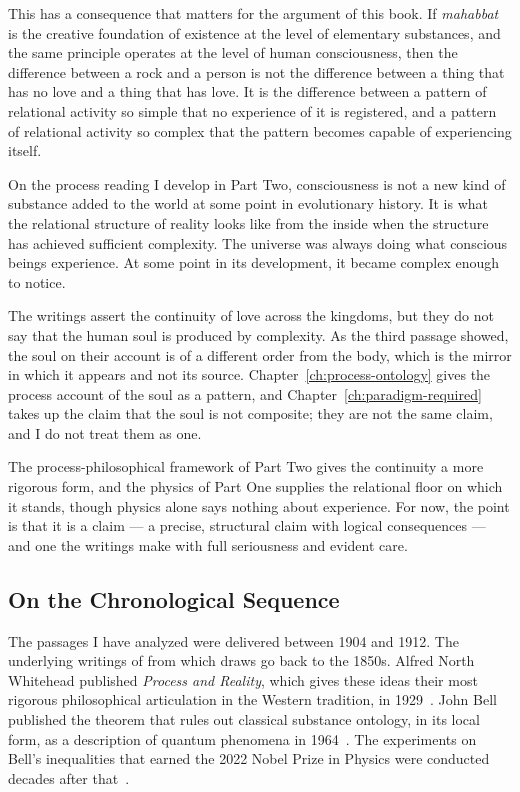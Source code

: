 This has a consequence that matters for the argument of this book.
If \textit{mahabbat} is the creative foundation of existence at the level of
elementary substances, and the same principle operates at the level of
human consciousness, then the difference between a rock and a person is not
the difference between a thing that has no love and a thing that has love.
It is the difference between a pattern of relational activity so simple
that no experience of it is registered, and a pattern of relational activity
so complex that the pattern becomes capable of experiencing itself.

On the process reading I develop in Part Two, consciousness is not a new kind
of substance added to the world at some point in evolutionary history.
It is what the relational structure of reality looks like from the inside when
the structure has achieved sufficient complexity.
The universe was always doing what conscious beings experience.
At some point in its development, it became complex enough to notice.

The \bahai writings assert the continuity of love across the kingdoms, but
they do not say that the human soul is produced by complexity.
As the third passage showed, the soul on their account is of a different order
from the body, which is the mirror in which it appears and not its source.
Chapter~\ref{ch:process-ontology} gives the process account of the soul as a
pattern, and Chapter~\ref{ch:paradigm-required} takes up the \bahai claim that
the soul is not composite; they are not the same claim, and I do not treat
them as one.

The process-philosophical framework of Part Two gives the continuity a more
rigorous form, and the physics of Part One supplies the relational floor on
which it stands, though physics alone says nothing about experience.
For now, the point is that it is a claim --- a precise, structural claim
with logical consequences --- and one the \bahai writings make with full
seriousness and evident care.

\subsection{On the Chronological Sequence}

The passages I have analyzed were delivered between 1904 and 1912.
The underlying writings of \Bahaullah from which \AbdulBaha draws go back
to the 1850s.
Alfred North Whitehead published \textit{Process and Reality}, which gives
these ideas their most rigorous philosophical articulation in the Western
tradition, in 1929~\citeyearpar{Whitehead1929}.
John Bell published the theorem that rules out classical substance ontology,
in its local form, as a description of quantum phenomena in 1964~\citeyearpar{Bell1964}.
The experiments on Bell's inequalities that earned the 2022 Nobel
Prize in Physics were conducted decades after that~\citeyearpar{Aspect1982}.

